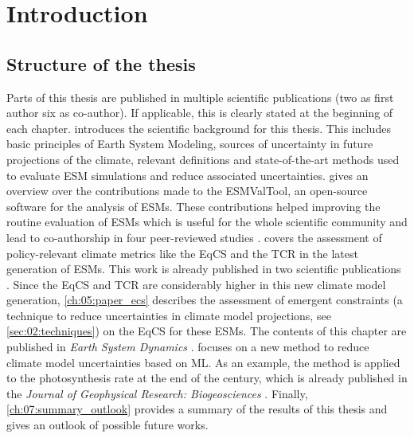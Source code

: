 


\chapter{Introduction}
\label{ch:01:introduction}


\section{Structure of the thesis}
\label{sec:01:structure}

Parts of this thesis are published in multiple scientific publications (two as
first author six as co-author). If applicable, this is clearly stated at the
beginning of each chapter.  introduces the
scientific background for this thesis. This includes basic principles of Earth
System Modeling, sources of uncertainty in future projections of the climate,
relevant definitions and state-of-the-art methods used to evaluate \ac{ESM}
simulations and reduce associated uncertainties.  gives
an overview over the contributions made to the \ac{ESMValTool}, an open-source
software for the analysis of \acp{ESM}. These contributions helped improving
the routine evaluation of \acp{ESM} which is useful for the whole scientific
community and lead to co-authorship in four peer-reviewed studies
\autocite{Righi2020, Eyring2020, Lauer2020, Weigel2020}.
 covers the assessment of
policy-relevant climate metrics like the \ac{EqCS} and the \ac{TCR} in the
latest generation of \acp{ESM}. This work is already published in two
scientific publications \autocite{Bock2020, Meehl2020}. Since the \ac{EqCS} and
\ac{TCR} are considerably higher in this new climate model generation,
\cref{ch:05:paper_ecs} describes the assessment of emergent constraints (a
technique to reduce uncertainties in climate model projections, see
\vref{sec:02:techniques}) on the \ac{EqCS} for these \acp{ESM}. The contents of
this chapter are published in \emph{Earth System Dynamics}
\autocite{Schlund2020a}.  focuses on a new method to
reduce climate model uncertainties based on \ac{ML}. As an example, the method
is applied to the photosynthesis rate at the end of the  century, which
is already published in the \emph{Journal of Geophysical Research:
Biogeosciences} \autocite{Schlund2020}. Finally, \cref{ch:07:summary_outlook}
provides a summary of the results of this thesis and gives an outlook of
possible future works.